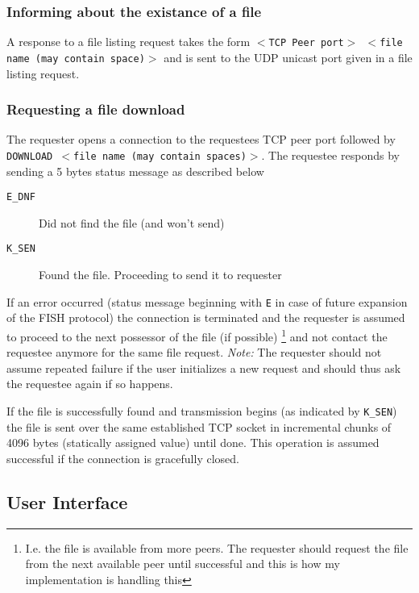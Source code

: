 \documentclass[11pt]{article}
\begin{document}
\subsubsection{Informing about the existance of a file}

A response to a file listing request takes the form
\texttt{$<$TCP Peer port$>$ $<$file name (may contain space)$>$} and is
sent to the UDP unicast port given in a file listing request.

\subsubsection{Requesting a file download}

The requester opens a connection to the requestees TCP peer port followed by
\texttt{DOWNLOAD $<$file name (may contain spaces)$>$}. The requestee responds
by sending a 5 bytes status message as described below

\begin{description}
    \item[\texttt{E\_DNF}] Did not find the file (and won't send)
    \item[\texttt{K\_SEN}] Found the file. Proceeding to send it to requester
\end{description}

If an error occurred (status message beginning with \texttt{E} in case of
future expansion of the FISH protocol) the connection is terminated and the
requester is assumed to proceed to the next possessor of the file (if possible)
\footnote{I.e. the file is available from more peers. The requester should
request the file from the next available peer until successful and this is how
my implementation is handling this}
and not contact the requestee anymore for the same file request. \textit{Note:}
The requester should not assume repeated failure if the user initializes a new
request and should thus ask the requestee again if so happens.

If the file is successfully found and transmission begins (as indicated by
\texttt{K\_SEN}) the file is sent over the same established TCP socket in
incremental chunks of 4096 bytes (statically assigned value) until done.
This operation is assumed successful if the connection is gracefully closed.

\subsection{User Interface}
\label{subsec:ui}
\end{document}
